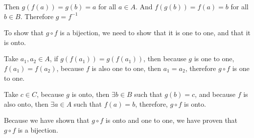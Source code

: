 Then $g(f(a)) = g(b) = a$ for all $a \in A$. And $f(g(b)) = f(a) = b$ for all $b \in B$. Therefore $g = f^{-1}$



To show that $g \circ f$ is a bijection, we need to show that it is one to one, and that it is onto. 

Take $a_1, a_2 \in A$, if $g(f(a_1)) = g(f(a_1))$, then because $g$ is one to one, $f(a_1) = f(a_2)$, because $f$ is also one to one, 
then $a_1 = a_2$, therefore $g \circ f$ is one to one. 

Take $c \in C$, because $g$ is onto, then $\exists b \in B$ such that $g(b) = c$, and because $f$ is also onto, then 
$\exists a \in A$ such that $f(a) = b$, therefore, $g \circ f$ is onto. 

Because we have shown that $g \circ f$ is onto and one to one, we have proven that $g \circ f$ is a bijection. 
\pagebreak